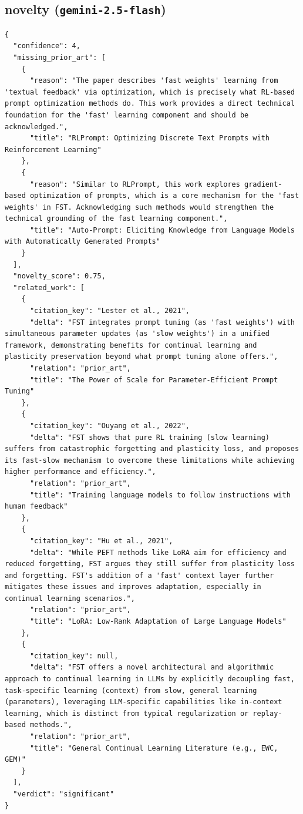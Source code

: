 \documentclass[11pt]{article}
\begin{document}
\subsection*{novelty (\texttt{gemini-2.5-flash})}
\begin{verbatim}
{
  "confidence": 4,
  "missing_prior_art": [
    {
      "reason": "The paper describes 'fast weights' learning from 'textual feedback' via optimization, which is precisely what RL-based prompt optimization methods do. This work provides a direct technical foundation for the 'fast' learning component and should be acknowledged.",
      "title": "RLPrompt: Optimizing Discrete Text Prompts with Reinforcement Learning"
    },
    {
      "reason": "Similar to RLPrompt, this work explores gradient-based optimization of prompts, which is a core mechanism for the 'fast weights' in FST. Acknowledging such methods would strengthen the technical grounding of the fast learning component.",
      "title": "Auto-Prompt: Eliciting Knowledge from Language Models with Automatically Generated Prompts"
    }
  ],
  "novelty_score": 0.75,
  "related_work": [
    {
      "citation_key": "Lester et al., 2021",
      "delta": "FST integrates prompt tuning (as 'fast weights') with simultaneous parameter updates (as 'slow weights') in a unified framework, demonstrating benefits for continual learning and plasticity preservation beyond what prompt tuning alone offers.",
      "relation": "prior_art",
      "title": "The Power of Scale for Parameter-Efficient Prompt Tuning"
    },
    {
      "citation_key": "Ouyang et al., 2022",
      "delta": "FST shows that pure RL training (slow learning) suffers from catastrophic forgetting and plasticity loss, and proposes its fast-slow mechanism to overcome these limitations while achieving higher performance and efficiency.",
      "relation": "prior_art",
      "title": "Training language models to follow instructions with human feedback"
    },
    {
      "citation_key": "Hu et al., 2021",
      "delta": "While PEFT methods like LoRA aim for efficiency and reduced forgetting, FST argues they still suffer from plasticity loss and forgetting. FST's addition of a 'fast' context layer further mitigates these issues and improves adaptation, especially in continual learning scenarios.",
      "relation": "prior_art",
      "title": "LoRA: Low-Rank Adaptation of Large Language Models"
    },
    {
      "citation_key": null,
      "delta": "FST offers a novel architectural and algorithmic approach to continual learning in LLMs by explicitly decoupling fast, task-specific learning (context) from slow, general learning (parameters), leveraging LLM-specific capabilities like in-context learning, which is distinct from typical regularization or replay-based methods.",
      "relation": "prior_art",
      "title": "General Continual Learning Literature (e.g., EWC, GEM)"
    }
  ],
  "verdict": "significant"
}
\end{verbatim}
\end{document}
